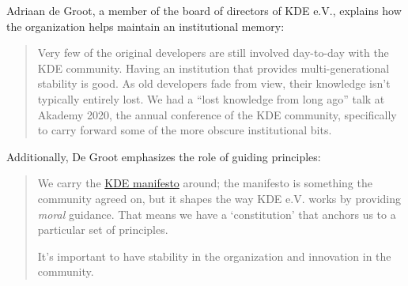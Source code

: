 \begin{kaobox}[frametitle=The role of KDE e.V. in maintaining institutional memory for the KDE community]

Adriaan de Groot, a member of the board of directors of KDE e.V., explains how the organization helps maintain an institutional memory:

\begin{quote}

Very few of the original developers are still involved day-to-day with the KDE community.  Having an institution that provides multi-generational stability is good.  As old developers fade from view, their knowledge isn't typically entirely lost.  We had a ``lost knowledge from long ago'' talk at Akademy 2020, the annual conference of the KDE community, specifically to carry forward some of the more obscure institutional bits.

\end{quote}

Additionally, De Groot emphasizes the role of guiding principles:

\begin{quote}

We carry the \href{https://manifesto.kde.org/}{KDE manifesto} around; the manifesto is something the community agreed on, but it shapes the way KDE e.V. works by providing \textit{moral} guidance.  That means we have a `constitution' that anchors us to a particular
set of principles.

It's important to have stability in the organization and innovation in the community.

\end{quote}

\end{kaobox}

